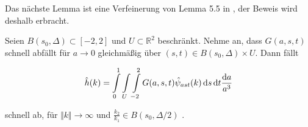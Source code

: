 Das nächste Lemma ist eine Verfeinerung von Lemma 5.5 in \textcite{Kutyniok2008}, der Beweis wird deshalb erbracht.
\begin{lemma}
\label{lemm:ruecktrafo_fourier_faellt_schnell_ab}

Seien $B(s_0,\Delta) \subset [-2,2]$ und $U \subset \mathbb{R}^2$ beschränkt. Nehme an, dass $G(a,s,t)$ schnell abfällt für $a \to 0$ gleichmäßig über $(s,t) \in  B(s_0,\Delta) \times U$. Dann fällt

\begin{equation*}
    \hat h(k) = \int \limits_0^1 \int \limits_U \int \limits_{-2}^2
    G(a,s,t) \hat \psi_{ast} (k)
        \mathop{}\!\mathrm{d} s \mathop{}\!\mathrm{d} t \frac{\mathop{}\!\mathrm{d} a}{a^3}
\end{equation*}

schnell ab, für $\Vert k \Vert \to \infty$ und $\frac{k_2}{k_1} \in B(s_0, \Delta/2)$ .
\end{lemma}

